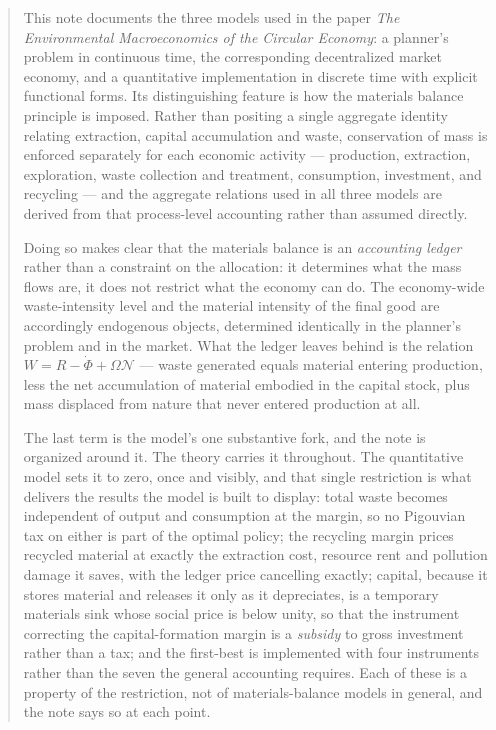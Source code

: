 \documentclass[a4paper]{article}
\begin{document}
\begin{abstract}
\noindent
This note documents the three models used in the paper \emph{The Environmental Macroeconomics of the Circular Economy}: a planner's problem in continuous time, the corresponding decentralized market economy, and a quantitative implementation in discrete time with explicit functional forms. Its distinguishing feature is how the materials balance principle is imposed. Rather than positing a single aggregate identity relating extraction, capital accumulation and waste, conservation of mass is enforced separately for each economic activity --- production, extraction, exploration, waste collection and treatment, consumption, investment, and recycling --- and the aggregate relations used in all three models are derived from that process-level accounting rather than assumed directly.

Doing so makes clear that the materials balance is an \emph{accounting ledger} rather than a constraint on the allocation: it determines what the mass flows are, it does not restrict what the economy can do. The economy-wide waste-intensity level and the material intensity of the final good are accordingly endogenous objects, determined identically in the planner's problem and in the market. What the ledger leaves behind is the relation $W=R-\dot\Phi+\Omega\mathcal N$ --- waste generated equals material entering production, less the net accumulation of material embodied in the capital stock, plus mass displaced from nature that never entered production at all.

The last term is the model's one substantive fork, and the note is organized around it. The theory carries it throughout. The quantitative model sets it to zero, once and visibly, and that single restriction is what delivers the results the model is built to display: total waste becomes independent of output and consumption at the margin, so no Pigouvian tax on either is part of the optimal policy; the recycling margin prices recycled material at exactly the extraction cost, resource rent and pollution damage it saves, with the ledger price cancelling exactly; capital, because it stores material and releases it only as it depreciates, is a temporary materials sink whose social price is below unity, so that the instrument correcting the capital-formation margin is a \emph{subsidy} to gross investment rather than a tax; and the first-best is implemented with four instruments rather than the seven the general accounting requires. Each of these is a property of the restriction, not of materials-balance models in general, and the note says so at each point.
\end{abstract}
\end{document}
